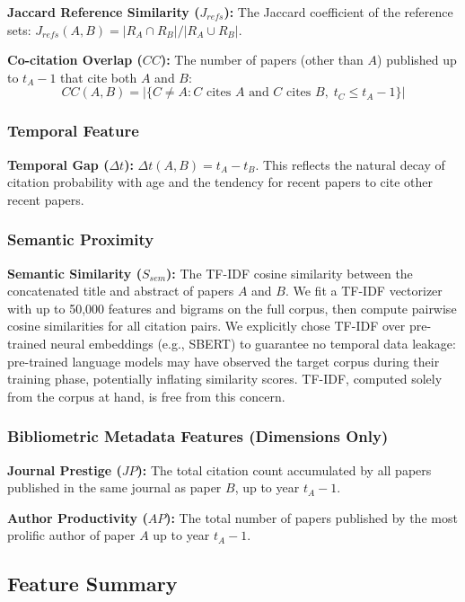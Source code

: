 \documentclass[12pt,a4paper]{article}
\begin{document}
\textbf{Jaccard Reference Similarity ($J_{refs}$):} The Jaccard coefficient of
the reference sets: $J_{refs}(A, B) = |R_A \cap R_B| / |R_A \cup R_B|$.

\textbf{Co-citation Overlap ($CC$):} The number of papers (other than $A$)
published up to $t_A - 1$ that cite both $A$ and $B$:
\begin{equation}
CC(A, B) = |\{C \ne A : C \text{ cites } A \text{ and } C \text{ cites } B,\; t_C \le t_A - 1\}|
\end{equation}

\subsubsection{Temporal Feature}

\textbf{Temporal Gap ($\Delta t$):} $\Delta t(A, B) = t_A - t_B$. This reflects
the natural decay of citation probability with age and the tendency for recent
papers to cite other recent papers.

\subsubsection{Semantic Proximity}

\textbf{Semantic Similarity ($S_{sem}$):} The TF-IDF cosine similarity between
the concatenated title and abstract of papers $A$ and $B$. We fit a TF-IDF
vectorizer with up to 50,000 features and bigrams on the full corpus, then compute
pairwise cosine similarities for all citation pairs. We explicitly chose TF-IDF
over pre-trained neural embeddings (e.g., SBERT) to guarantee no temporal data
leakage: pre-trained language models may have observed the target corpus during
their training phase, potentially inflating similarity scores. TF-IDF, computed
solely from the corpus at hand, is free from this concern.

\subsubsection{Bibliometric Metadata Features (Dimensions Only)}

\textbf{Journal Prestige ($JP$):} The total citation count accumulated by all
papers published in the same journal as paper $B$, up to year $t_A - 1$.

\textbf{Author Productivity ($AP$):} The total number of papers published by the
most prolific author of paper $A$ up to year $t_A - 1$.

\subsection{Feature Summary}
\end{document}

